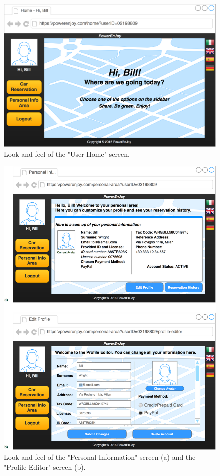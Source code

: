 \begin{figure}[H]
\centering
		\includegraphics[width=\textwidth]{./user_interface_design/diagrams/web_user_home.png}
		\caption{Look and feel of the "User Home" screen.}
		\label{web_user_home}
\end{figure}

\begin{figure}[H]
\centering
		\includegraphics[width=\textwidth]{./user_interface_design/diagrams/web_personal_info_editor.png}
		\caption{Look and feel of the "Personal Information" screen (a) and the "Profile Editor" screen (b).}
		\label{web_personal_info_editor}
\end{figure}

